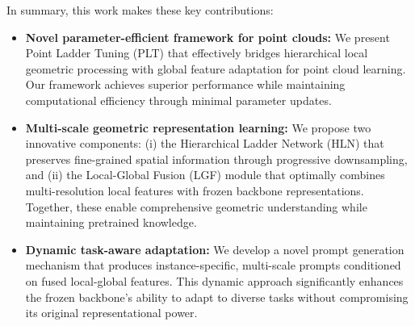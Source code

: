 
In summary, this work makes these key contributions:
\begin{itemize}
	\item \textbf{Novel parameter-efficient framework for point clouds:} We present Point Ladder Tuning (PLT) that effectively bridges hierarchical local geometric processing with global feature adaptation for point cloud learning. Our framework achieves superior performance while maintaining computational efficiency through minimal parameter updates.
	
	\item \textbf{Multi-scale geometric representation learning:} We propose two innovative components: (i) the Hierarchical Ladder Network (HLN) that preserves fine-grained spatial information through progressive downsampling, and (ii) the Local-Global Fusion (LGF) module that optimally combines multi-resolution local features with frozen backbone representations. Together, these enable comprehensive geometric understanding while maintaining pretrained knowledge.
	
	\item \textbf{Dynamic task-aware adaptation:} We develop a novel prompt generation mechanism that produces instance-specific, multi-scale prompts conditioned on fused local-global features. This dynamic approach significantly enhances the frozen backbone's ability to adapt to diverse tasks without compromising its original representational power.
\end{itemize}




